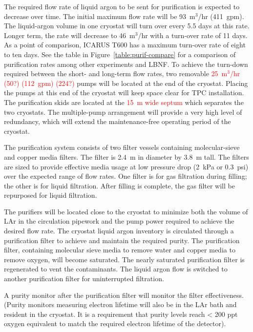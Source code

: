 The required flow rate of liquid argon to be sent for purification 
is expected to decrease over time. The initial maximum flow rate 
will be 93~m$^3$/hr (411~gpm). The liquid-argon volume in one 
cryostat will turn over every 5.5 days at this rate. 
Longer term, the rate will decrease to 46~m$^3$/hr 
with a turn-over rate of 11 days.  As a point of comparison, ICARUS 
T600 has a maximum turn-over rate of eight to ten days. See the table 
in Figure~\ref{table:purif-compare} for a comparison of purification 
rates among other experiments and LBNF. To 
achieve the turn-down required between the short- and long-term flow rates, 
two removable \textcolor{red}{25~m$^3$/hr (50?) (112~gpm) (224?)} pumps 
will be located at the end of the cryostat. Placing the pumps at this 
end of the cryostat will keep space clear for TPC installation. The 
purification skids are located at the \textcolor{red}{15~m wide septum} which separates 
the two cryostats.  The multiple-pump arrangement will provide a very 
high level of redundancy, which will extend the maintenance-free 
operating period of the cryostat.  


The purification system consists of two filter vessels containing molecular-sieve and copper media filters. The filter is 2.4~m in diameter by 3.8~m tall. The filters are sized to provide effective media usage at low pressure drop (2~kPa or 0.3~psi) over the expected range of flow rates. 
One filter is for gas filtration during filling; the other is for liquid filtration. After filling is complete, the gas filter will be repurposed for liquid filtration.

The 
purifiers will be located close to the cryostat to minimize both the volume of LAr in the circulation pipework 
and the pump power required to achieve the desired flow rate.  
The cryostat liquid argon inventory is circulated through a purification filter to achieve and maintain the required purity. The purification filter, containing molecular sieve media to remove water and copper media to remove oxygen, will become saturated.
The nearly saturated purification filter is regenerated to vent the contaminants. The liquid argon flow is switched to another purification filter for uninterrupted filtration. 

A purity monitor after the purification filter will monitor the filter effectiveness. (Purity monitors measuring electron lifetime will also be in the LAr bath and resident in the cryostat.  It is a requirement that purity levels reach < 200 ppt oxygen equivalent to match the required electron lifetime of the detector). 

